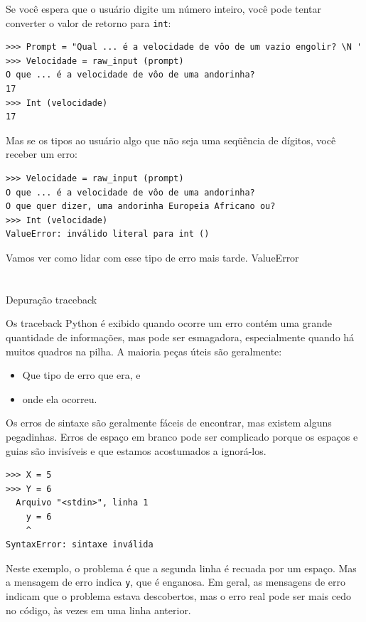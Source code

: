 \documentclass[10pt]{book}
\begin{document}
\begin{exercise}
{{Se você espera que o usuário digite um número inteiro, você pode tentar converter
o valor de retorno para {\tt int}:

\begin{verbatim}
>>> Prompt = "Qual ... é a velocidade de vôo de um vazio engolir? \N '
>>> Velocidade = raw_input (prompt)
O que ... é a velocidade de vôo de uma andorinha?
17
>>> Int (velocidade)
17
\end{verbatim}
%
Mas se os tipos ao usuário algo que não seja uma seqüência de dígitos,
você receber um erro:

\begin{verbatim}
>>> Velocidade = raw_input (prompt)
O que ... é a velocidade de vôo de uma andorinha?
O que quer dizer, uma andorinha Europeia Africano ou?
>>> Int (velocidade)
ValueError: inválido literal para int ()
\end{verbatim}
%
Vamos ver como lidar com esse tipo de erro mais tarde.
\index{} ValueError


\section{} Depuração
\label{espaços}
\index{} traceback

Os traceback Python é exibido quando ocorre um erro contém
uma grande quantidade de informações, mas pode ser esmagadora, especialmente
quando há muitos quadros na pilha. A maioria
peças úteis são geralmente:

\begin{itemize}

\item Que tipo de erro que era, e

\item onde ela ocorreu.

\end{itemize}

Os erros de sintaxe são geralmente fáceis de encontrar, mas existem alguns
pegadinhas. Erros de espaço em branco pode ser complicado porque os espaços e
guias são invisíveis e que estamos acostumados a ignorá-los.

\begin{verbatim}
>>> X = 5
>>> Y = 6
  Arquivo "<stdin>", linha 1
    y = 6
    ^
SyntaxError: sintaxe inválida
\end{verbatim}
%
Neste exemplo, o problema é que a segunda linha é recuada por
um espaço. Mas a mensagem de erro indica {\tt y}, que é
enganosa. Em geral, as mensagens de erro indicam que o problema estava
descobertos, mas o erro real pode ser mais cedo no código,
às vezes em uma linha anterior.

}}
\end{exercise}
\end{document}
